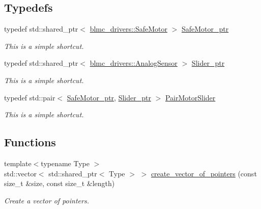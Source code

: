 \subsection*{Typedefs}
\begin{DoxyCompactItemize}
\item 
typedef std\+::shared\+\_\+ptr$<$ \hyperlink{classblmc__drivers_1_1SafeMotor}{blmc\+\_\+drivers\+::\+Safe\+Motor} $>$ \hyperlink{namespaceblmc__drivers_ab975c3be3c53a93a10c491f07a132e2b}{Safe\+Motor\+\_\+ptr}\hypertarget{namespaceblmc__drivers_ab975c3be3c53a93a10c491f07a132e2b}{}\label{namespaceblmc__drivers_ab975c3be3c53a93a10c491f07a132e2b}

\begin{DoxyCompactList}\small\item\em This is a simple shortcut. \end{DoxyCompactList}\item 
typedef std\+::shared\+\_\+ptr$<$ \hyperlink{classblmc__drivers_1_1AnalogSensor}{blmc\+\_\+drivers\+::\+Analog\+Sensor} $>$ \hyperlink{namespaceblmc__drivers_a1eb492ab42b913d5bcc21d53ba7185ba}{Slider\+\_\+ptr}\hypertarget{namespaceblmc__drivers_a1eb492ab42b913d5bcc21d53ba7185ba}{}\label{namespaceblmc__drivers_a1eb492ab42b913d5bcc21d53ba7185ba}

\begin{DoxyCompactList}\small\item\em This is a simple shortcut. \end{DoxyCompactList}\item 
typedef std\+::pair$<$ \hyperlink{namespaceblmc__drivers_ab975c3be3c53a93a10c491f07a132e2b}{Safe\+Motor\+\_\+ptr}, \hyperlink{namespaceblmc__drivers_a1eb492ab42b913d5bcc21d53ba7185ba}{Slider\+\_\+ptr} $>$ \hyperlink{namespaceblmc__drivers_a134270c90d29a9a28b64ab0e5f7158f7}{Pair\+Motor\+Slider}\hypertarget{namespaceblmc__drivers_a134270c90d29a9a28b64ab0e5f7158f7}{}\label{namespaceblmc__drivers_a134270c90d29a9a28b64ab0e5f7158f7}

\begin{DoxyCompactList}\small\item\em This is a simple shortcut. \end{DoxyCompactList}\end{DoxyCompactItemize}
\subsection*{Functions}
\begin{DoxyCompactItemize}
\item 
{\footnotesize template$<$typename Type $>$ }\\std\+::vector$<$ std\+::shared\+\_\+ptr$<$ Type $>$ $>$ \hyperlink{namespaceblmc__drivers_add73ea2a43509013ad00665753f175e1}{create\+\_\+vector\+\_\+of\+\_\+pointers} (const size\+\_\+t \&size, const size\+\_\+t \&length)
\begin{DoxyCompactList}\small\item\em Create a vector of pointers. \end{DoxyCompactList}\end{DoxyCompactItemize}


